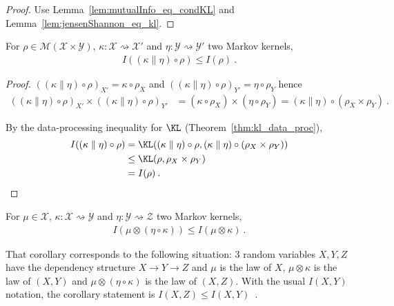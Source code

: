\begin{proof}%
{}
Use Lemma~\ref{lem:mutualInfo_eq_condKL} and Lemma~\ref{lem:jensenShannon_eq_kl}.
\end{proof}


\begin{theorem}
  \label{thm:mutualInfo_data_proc}
  For $\rho \in \mathcal M(\mathcal X \times \mathcal Y)$, $\kappa : \mathcal X \rightsquigarrow \mathcal X'$ and $\eta : \mathcal Y \rightsquigarrow \mathcal Y'$ two Markov kernels,
  \begin{align*}
  I((\kappa \parallel \eta) \circ \rho) \le I(\rho) \: .
  \end{align*}
\end{theorem}

\begin{proof}%
{}
$((\kappa \parallel \eta) \circ \rho)_{X'} = \kappa \circ \rho_X$ and $((\kappa \parallel \eta) \circ \rho)_{Y'} = \eta \circ \rho_Y$ hence
\begin{align*}
((\kappa \parallel \eta) \circ \rho)_{X'} \times ((\kappa \parallel \eta) \circ \rho)_{Y'}
&= (\kappa \circ \rho_X) \times (\eta \circ \rho_Y)
= (\kappa \parallel \eta) \circ (\rho_X \times \rho_Y)
\: .
\end{align*}

By the data-processing inequality for $\KL$ (Theorem~\ref{thm:kl_data_proc}),
\begin{align*}
I((\kappa \parallel \eta) \circ \rho)
&= \KL((\kappa \parallel \eta) \circ \rho, (\kappa \parallel \eta) \circ (\rho_X \times \rho_Y))
\\
&\le \KL(\rho, \rho_X \times \rho_Y)
\\
&= I(\rho)
\: .
\end{align*}
\end{proof}

\begin{corollary}
  \label{cor:mutualInfo_compProd_le}
  For $\mu \in \mathcal X$, $\kappa : \mathcal X \rightsquigarrow \mathcal Y$ and $\eta : \mathcal Y \rightsquigarrow \mathcal Z$ two Markov kernels,
  \begin{align*}
  I(\mu \otimes (\eta \circ \kappa)) \le I(\mu \otimes \kappa)
  \: .
  \end{align*}
\end{corollary}

That corollary corresponds to the following situation: 3 random variables $X, Y, Z$ have the dependency structure $X \to Y \to Z$ and $\mu$ is the law of $X$, $\mu \otimes \kappa$ is the law of $(X, Y)$ and $\mu \otimes (\eta \circ \kappa)$ is the law of $(X, Z)$.
With the usual $I(X, Y)$ notation, the corollary statement is $I(X, Z) \le I(X, Y)$~.

